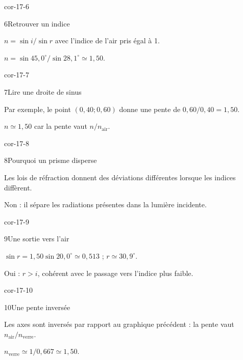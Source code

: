 \begin{blocLivre}{cor-17-6}\begin{corrige}{6}{Retrouver un indice}
\begin{questions}
\item $n=\sin i/\sin r$ avec l’indice de l’air pris égal à 1.
\item $n=\sin45,0^\circ/\sin28,1^\circ\simeq1,50$.
\end{questions}
\end{corrige}\end{blocLivre}
\begin{blocLivre}{cor-17-7}\begin{corrige}{7}{Lire une droite de sinus}
\begin{questions}
\item Par exemple, le point $(0,40;0,60)$ donne une pente de $0,60/0,40=1,50$.
\item $n\simeq1,50$ car la pente vaut $n/n_{\mathrm{air}}$.
\end{questions}
\end{corrige}\end{blocLivre}
\begin{blocLivre}{cor-17-8}\begin{corrige}{8}{Pourquoi un prisme disperse}
\begin{questions}
\item Les lois de réfraction donnent des déviations différentes lorsque les indices diffèrent.
\item Non : il sépare les radiations présentes dans la lumière incidente.
\end{questions}
\end{corrige}\end{blocLivre}
\begin{blocLivre}{cor-17-9}\begin{corrige}{9}{Une sortie vers l’air}
\begin{questions}
\item $\sin r=1,50\sin20,0^\circ\simeq0,513$ ; $r\simeq30,9^\circ$.
\item Oui : $r>i$, cohérent avec le passage vers l’indice plus faible.
\end{questions}
\end{corrige}\end{blocLivre}
\begin{blocLivre}{cor-17-10}\begin{corrige}{10}{Une pente inversée}
\begin{questions}
\item Les axes sont inversés par rapport au graphique précédent : la pente vaut $n_{\mathrm{air}}/n_{\mathrm{verre}}$.
\item $n_{\mathrm{verre}}\simeq1/0,667\simeq1,50$.
\end{questions}
\end{corrige}\end{blocLivre}
